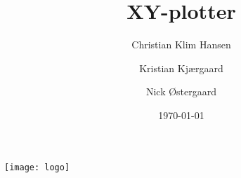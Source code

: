 \documentclass{../mypaper}
\title{XY-plotter}
\author{Christian Klim Hansen \and Kristian Kjærgaard \and Nick Østergaard}
\date{\today}
\begin{document}
\begin{titlingpage}
  \maketitle
  \texttt{[image: logo]}
\end{titlingpage}

\frontmatter

\tableofcontents



\mainmatter








\listoffigures

\listoftables

\listoffixmes
\end{document}
